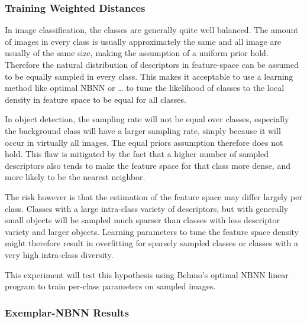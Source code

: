 \subsubsection{Training Weighted Distances} %
\label{ssub:training_weighted_distances}

In image classification, the classes are generally quite well balanced. The amount of images in every class is usually approximately the same and all image are usually of the same size, making the assumption of a uniform prior hold. Therefore the natural distribution of descriptors in feature-space can be assumed to be equally sampled in every class. This makes it acceptable to use a learning method like optimal NBNN\cite{behmo2010towards} or \ldots {}\cite{wang2011improved} to tune the likelihood of classes to the local density in feature space to be equal for all classes.

In object detection, the sampling rate will not be equal over classes, especially the background class will have a larger sampling rate, simply because it will occur in virtually all images. The equal priors assumption therefore does not hold. This flaw is mitigated by the fact that a higher number of sampled descriptors also tends to make the feature space for that class more dense, and more likely to be the nearest neighbor.

The risk however is that the estimation of the feature space may differ largely per class. Classes with a large intra-class variety of descriptors, but with generally small objects will be sampled much sparser than classes with less descriptor variety and larger objects. Learning parameters to tune the feature space density might therefore result in overfitting for sparsely sampled classes or classes with a very high intra-class diversity.

This experiment will test this hypothesis using Behmo's optimal NBNN linear program to train per-class parameters on sampled images.



\subsubsection{Exemplar-NBNN Results} %
\label{sub:exemplar_nbnn_results}

